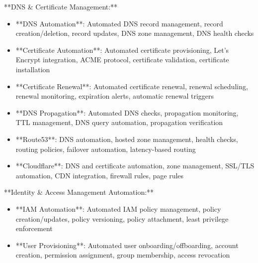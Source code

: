 \documentclass[11pt,a4paper]{article}
\begin{document}
**DNS \& Certificate Management:**

\begin{itemize}
\item **DNS Automation**: Automated DNS record management, record creation/deletion, record updates, DNS zone management, DNS health checks
\end{itemize}

\begin{itemize}
\item **Certificate Automation**: Automated certificate provisioning, Let's Encrypt integration, ACME protocol, certificate validation, certificate installation
\end{itemize}

\begin{itemize}
\item **Certificate Renewal**: Automated certificate renewal, renewal scheduling, renewal monitoring, expiration alerts, automatic renewal triggers
\end{itemize}

\begin{itemize}
\item **DNS Propagation**: Automated DNS checks, propagation monitoring, TTL management, DNS query automation, propagation verification
\end{itemize}

\begin{itemize}
\item **Route53**: DNS automation, hosted zone management, health checks, routing policies, failover automation, latency-based routing
\end{itemize}

\begin{itemize}
\item **Cloudflare**: DNS and certificate automation, zone management, SSL/TLS automation, CDN integration, firewall rules, page rules
\end{itemize}

**Identity \& Access Management Automation:**

\begin{itemize}
\item **IAM Automation**: Automated IAM policy management, policy creation/updates, policy versioning, policy attachment, least privilege enforcement
\end{itemize}

\begin{itemize}
\item **User Provisioning**: Automated user onboarding/offboarding, account creation, permission assignment, group membership, access revocation
\end{itemize}
\end{document}
